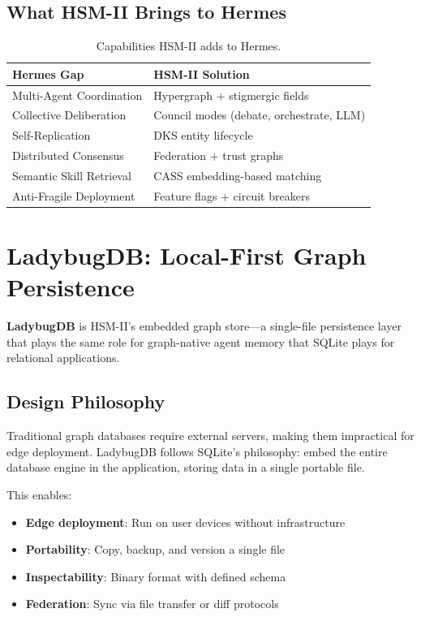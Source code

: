 \documentclass[11pt]{article}
\begin{document}
\subsection{What HSM-II Brings to Hermes}

\begin{table}[H]
\centering
\caption{Capabilities HSM-II adds to Hermes.}
\label{tab:hsmii_hermes}
\small
\begin{tabular}{ll}
\toprule
\textbf{Hermes Gap} & \textbf{HSM-II Solution} \\
\midrule
Multi-Agent Coordination & Hypergraph + stigmergic fields \\
Collective Deliberation & Council modes (debate, orchestrate, LLM) \\
Self-Replication & DKS entity lifecycle \\
Distributed Consensus & Federation + trust graphs \\
Semantic Skill Retrieval & CASS embedding-based matching \\
Anti-Fragile Deployment & Feature flags + circuit breakers \\
\bottomrule
\end{tabular}
\end{table}

\section{LadybugDB: Local-First Graph Persistence}
\nopagebreak[4]
\label{sec:ladybug}

\textbf{LadybugDB} is HSM-II's embedded graph store---a single-file persistence
layer that plays the same role for graph-native agent memory that SQLite plays
for relational applications.

\subsection{Design Philosophy}

Traditional graph databases require external servers, making them impractical
for edge deployment. LadybugDB follows SQLite's philosophy: embed the entire
database engine in the application, storing data in a single portable file.

This enables:
\begin{itemize}[noitemsep,topsep=4pt]
  \item \textbf{Edge deployment}: Run on user devices without infrastructure
  \item \textbf{Portability}: Copy, backup, and version a single file
  \item \textbf{Inspectability}: Binary format with defined schema
  \item \textbf{Federation}: Sync via file transfer or diff protocols
\end{itemize}
\end{document}
